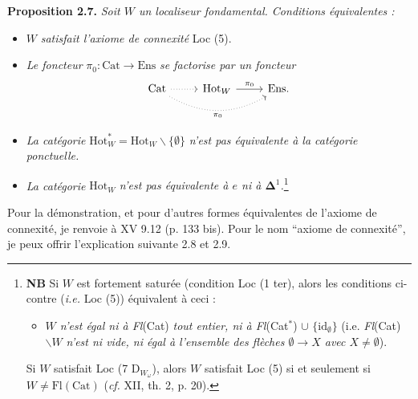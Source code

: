 \textbf{Proposition 2.7.} \textit{Soit $W$ un localiseur fondamental. Conditions équivalentes :}
\begin{itemize}[leftmargin=3em]
\item[a)] $W$ \textit{satisfait l'axiome de connexité} Loc (5).
\item[b)] \textit{Le foncteur} $\pi_0 : \mathrm{Cat} \longrightarrow \mathrm{Ens}$ \textit{se factorise par un foncteur}
\[
\begin{tikzcd}
\mathrm{Cat} \arrow[r, dotted] \arrow[rr, dotted, bend right, "\pi_0"'] & \mathrm{Hot}_W \arrow[r, "\pi_0"] & \mathrm{Ens}.
\end{tikzcd}
\]
\item[c)] \textit{La catégorie} $\mathrm{Hot}^*_W = \mathrm{Hot}_W\backslash\{\emptyset\}$ \textit{n'est pas équivalente à la catégorie ponctuelle.}
\item[c$'$)] \textit{La catégorie} $\mathrm{Hot}_W$ \textit{n'est pas équivalente à $e$ ni à $\boldsymbol{\Delta}^1$.}\footnote{\textbf{NB} Si $W$ est fortement saturée (condition Loc (1 ter), alors les conditions ci-contre (\textit{i.e.} Loc (5)) équivalent à ceci : %
\begin{itemize}[leftmargin=2.5em]
\item[d)] \textit{$W$ n'est égal ni à Fl}(Cat) \textit{tout entier, ni à Fl}(Cat$^*$) $\cup$ $\{\mathrm{id}_\emptyset\}$ (i.e. \textit{Fl}(Cat)$\backslash W$ \textit{n'est ni vide, ni égal à l'ensemble des flèches $\emptyset \longrightarrow X$ avec $X \neq \emptyset$}).
\end{itemize}
Si $W$ satisfait Loc (7 D$_{W_\omega}$), alors $W$ satisfait Loc (5) si et seulement si $W \neq \mathrm{Fl}(\mathrm{Cat})$ (\textit{cf.} XII, th. 2, p. 20).}
\end{itemize}

Pour la démonstration, et pour d'autres formes équivalentes de l'axiome de connexité, je renvoie à XV 9.12 (p. 133 bis). Pour le nom “axiome de connexité”, je peux offrir l'explication suivante 2.8 et 2.9.

